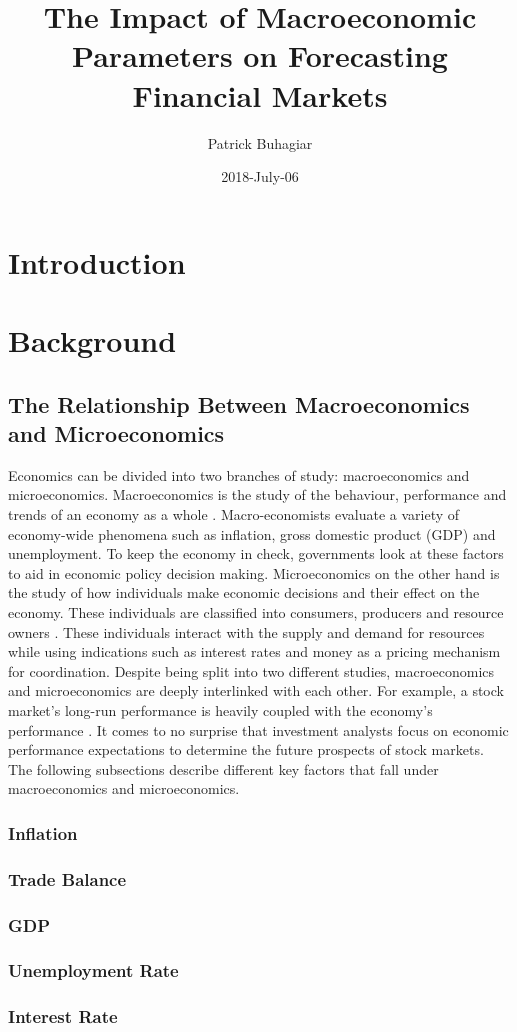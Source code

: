 \documentclass{UoYCSproject}
\author{Patrick Buhagiar}
\title{The Impact of Macroeconomic Parameters on Forecasting Financial Markets}
\date{2018-July-06}
\begin{document}
\maketitle

\listoffigures
\listoftables

\label{sec:start}
\thispagestyle{empty}\cleardoublepage

\chapter{Introduction}
\label{cha:introduction}



\chapter{Background}
\label{cha:background}

\section{The Relationship Between Macroeconomics and Microeconomics}
Economics can be divided into two branches of study: macroeconomics and microeconomics. Macroeconomics is the study of the behaviour, performance and trends of an economy as a whole \cite{2003economics}. Macro-economists evaluate a variety of economy-wide phenomena such as inflation, gross domestic product (GDP) and unemployment. To keep the economy in check, governments look at these factors to aid in economic policy decision making. Microeconomics on the other hand is the study of how individuals make economic decisions and their effect on the economy. These individuals are classified into consumers, producers and resource owners \cite{dwivedi2002microeconomics}. These individuals interact with the supply and demand for resources while using indications such as interest rates and money as a pricing mechanism for coordination.  Despite being split into two different studies, macroeconomics and microeconomics are deeply interlinked with each other. For example, a stock market's long-run performance is heavily coupled with the economy's performance \cite{davis2008macroeconomic}. It comes to no surprise that investment analysts focus on economic performance expectations to determine the future prospects of stock markets. The following subsections describe different key factors that fall under macroeconomics and microeconomics.

\subsection{Inflation}


\subsection{Trade Balance}
\subsection{GDP}
\subsection{Unemployment Rate}
\subsection{Interest Rate}

\medskip
 
\printbibliography
\end{document}
